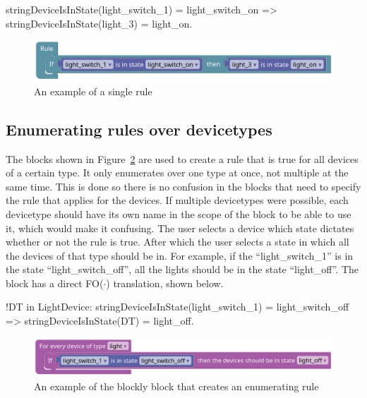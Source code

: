 \documentclass[11pt,a4paper]{report}
\newcommand{\fodot}{FO($\cdot$)\xspace}
\begin{document}
\begin{idplisting}
stringDeviceIsInState(light_switch_1) = light_switch_on =>
stringDeviceIsInState(light_3) = light_on.
\end{idplisting}

\begin{figure}
    \centering
    \includegraphics[width=0.8\linewidth]{images/homy_single_rule.png}
    \caption{An example of a single rule}
    \label{fig:homy_single_rule}
\end{figure}

\subsection{Enumerating rules over devicetypes}
The blocks shown in Figure~\ref{fig:homy_enumerate_rule_devicetype} are used to create a rule that is true for all devices of a certain type. It only enumerates over one type at once, not multiple at the same time. This is done so there is no confusion in the blocks that need to specify the rule that applies for the devices. If multiple devicetypes were possible, each devicetype should have its own name in the scope of the block to be able to use it, which would make it confusing. The user selects a device which state dictates whether or not the rule is true. After which the user selects a state in which all the devices of that type should be in. For example, if the ``light\_switch\_1'' is in the state ``light\_switch\_off'', all the lights should be in the state ``light\_off''. The block has a direct \fodot translation, shown below.
\newpage

\begin{idplisting}
!DT in LightDevice: 
stringDeviceIsInState(light_switch_1) = light_switch_off => 
stringDeviceIsInState(DT) = light_off.
\end{idplisting}

\begin{figure}
    \centering
    \includegraphics[width=0.8\linewidth]{images/homy_enumerate_rule_devicetype.png}
    \caption{An example of the blockly block that creates an enumerating rule}
    \label{fig:homy_enumerate_rule_devicetype}
\end{figure}
\end{document}
